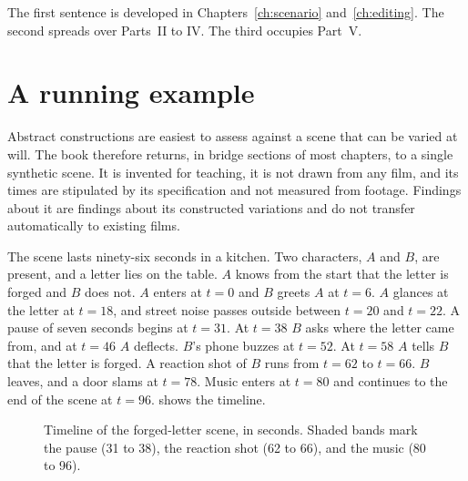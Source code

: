 The first sentence is developed in Chapters~\ref{ch:scenario} and~\ref{ch:editing}. The second spreads over Parts~II to IV. The third occupies Part~V.

\section{A running example}\label{sec:scene}

Abstract constructions are easiest to assess against a scene that can be varied at will. The book therefore returns, in bridge sections of most chapters, to a single synthetic scene. It is invented for teaching, it is not drawn from any film, and its times are stipulated by its specification and not measured from footage. Findings about it are findings about its constructed variations and do not transfer automatically to existing films.

The scene lasts ninety-six seconds in a kitchen. Two characters, $A$ and $B$, are present, and a letter lies on the table. $A$ knows from the start that the letter is forged and $B$ does not. $A$ enters at $t=0$ and $B$ greets $A$ at $t=6$. $A$ glances at the letter at $t=18$, and street noise passes outside between $t=20$ and $t=22$. A pause of seven seconds begins at $t=31$. At $t=38$ $B$ asks where the letter came from, and at $t=46$ $A$ deflects. $B$'s phone buzzes at $t=52$. At $t=58$ $A$ tells $B$ that the letter is forged. A reaction shot of $B$ runs from $t=62$ to $t=66$. $B$ leaves, and a door slams at $t=78$. Music enters at $t=80$ and continues to the end of the scene at $t=96$.  shows the timeline.

\begin{figure}[ht]
\centering
{}
\caption{Timeline of the forged-letter scene, in seconds. Shaded bands mark the pause (31 to 38), the reaction shot (62 to 66), and the music (80 to 96).}
\label{fig:timeline}
\end{figure}

